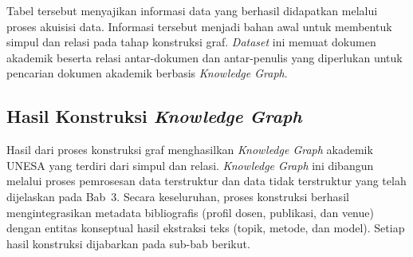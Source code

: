 Tabel tersebut menyajikan informasi data yang berhasil didapatkan melalui proses akuisisi data. Informasi tersebut menjadi bahan awal untuk membentuk simpul dan relasi pada tahap konstruksi graf. \textit{Dataset} ini memuat dokumen akademik beserta relasi antar-dokumen dan antar-penulis yang diperlukan untuk pencarian dokumen akademik berbasis \textit{Knowledge Graph}.

\subsection{Hasil Konstruksi \textit{Knowledge Graph}}

Hasil dari proses konstruksi graf menghasilkan \textit{Knowledge Graph} akademik UNESA yang terdiri dari simpul dan relasi. \textit{Knowledge Graph} ini dibangun melalui proses pemrosesan data terstruktur dan data tidak terstruktur yang telah dijelaskan pada Bab~3. Secara keseluruhan, proses konstruksi berhasil mengintegrasikan metadata bibliografis (profil dosen, publikasi, dan venue) dengan entitas konseptual hasil ekstraksi teks (topik, metode, dan model). Setiap hasil konstruksi dijabarkan pada sub-bab berikut.


